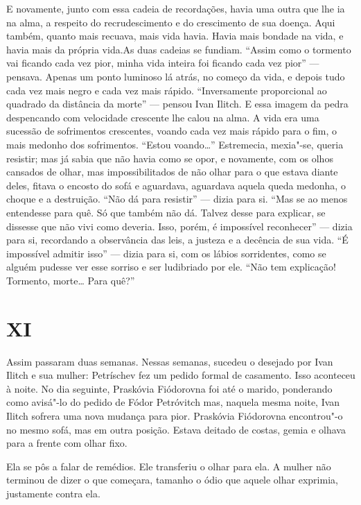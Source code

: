 E novamente, junto com essa cadeia de recordações, havia uma outra que
lhe ia na alma, a respeito do recrudescimento e do crescimento de sua
doença. Aqui também, quanto mais recuava, mais vida havia. Havia mais
bondade na vida, e havia mais da própria vida.As duas cadeias se
fundiam. ``Assim como o tormento vai ficando cada vez pior, minha vida
inteira foi ficando cada vez pior'' --- pensava. Apenas um ponto luminoso
lá atrás, no começo da vida, e depois tudo cada vez mais negro e cada
vez mais rápido. ``Inversamente proporcional ao quadrado da distância da
morte'' --- pensou Ivan Ilitch. E essa imagem da pedra despencando com
velocidade crescente lhe calou na alma. A vida era uma sucessão de
sofrimentos crescentes, voando cada vez mais rápido para o fim, o mais
medonho dos sofrimentos. ``Estou voando\ldots{}'' Estremecia, mexia"-se,
queria resistir; mas já sabia que não havia como se opor, e novamente,
com os olhos cansados de olhar, mas impossibilitados de não olhar para o
que estava diante deles, fitava o encosto do sofá e aguardava, aguardava
aquela queda medonha, o choque e a destruição. ``Não dá para resistir''
--- dizia para si. ``Mas se ao menos entendesse para quê. Só que também
não dá. Talvez desse para explicar, se dissesse que não vivi como
deveria. Isso, porém, é impossível reconhecer'' --- dizia para si,
recordando a observância das leis, a justeza e a decência de sua vida.
``É impossível admitir isso'' --- dizia para si, com os lábios
sorridentes, como se alguém pudesse ver esse sorriso e ser ludibriado
por ele. ``Não tem explicação! Tormento, morte\ldots{} Para quê?''

\section{XI}

Assim passaram duas semanas. Nessas semanas, sucedeu o desejado por Ivan
Ilitch e sua mulher: Petríschev fez um pedido formal de casamento. Isso
aconteceu à noite. No dia seguinte, Praskóvia Fiódorovna foi até o
marido, ponderando como avisá"-lo do pedido de Fódor Petróvitch mas,
naquela mesma noite, Ivan Ilitch sofrera uma nova mudança para pior.
Praskóvia Fiódorovna encontrou"-o no mesmo sofá, mas em outra posição.
Estava deitado de costas, gemia e olhava para a frente com olhar fixo.

Ela se pôs a falar de remédios. Ele transferiu o olhar para ela. A
mulher não terminou de dizer o que começara, tamanho o ódio que aquele
olhar exprimia, justamente contra ela.

